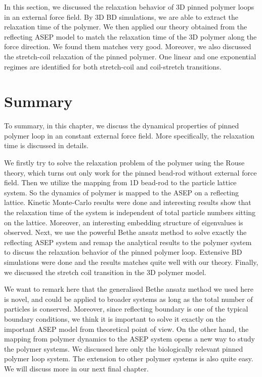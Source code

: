 In this section, we discussed the relaxation behavior of 3D pinned polymer loops in an external force field. By 3D BD simulations, we are able to extract the relaxation time of the polymer. We then applied our theory obtained from the reflecting ASEP model to match the relaxation time of the 3D polymer along the force direction. We found them matches very good. Moreover, we also discussed the stretch-coil relaxation of the pinned polymer. One linear and one exponential regimes are identified for both stretch-coil and coil-stretch transitions.











\section{Summary}
\label{sec:summary}

To summary, in this chapter, we discuss the dynamical properties of pinned polymer loop in an constant external force field. More specifically, the relaxation time is discussed in details. 

We firstly try to solve the relaxation problem of the polymer using the Rouse theory, which turns out only work for the pinned bead-rod without external force field. Then we utilize the mapping from 1D bead-rod to the particle lattice system. So the dynamics of polymer is mapped to the ASEP on a reflecting lattice. Kinetic Monte-Carlo results were done and interesting results show that the relaxation time of the system is independent of total particle numbers sitting on the lattice. Moreover, an interesting embedding structure of eigenvalues is observed. Next, we use the powerful Bethe ansatz method to solve exactly the reflecting ASEP system and remap the analytical results to the polymer system to discuss the relaxation behavior of the pinned polymer loop. Extensive BD simulations were done and the results matches quite well with our theory. Finally, we discussed the stretch coil transition in the 3D polymer model.

We want to remark here that the generalised Bethe ansatz method we used here is novel, and could be applied to broader systems as long as the total number of particles is conserved. Moreover, since reflecting boundary is one of the typical boundary conditions, we think it is important to solve it exactly on the important ASEP model from theoretical point of view. On the other hand, the mapping from polymer dynamics to the ASEP system opens a new way to study the polymer systems. We discussed here only the biologically relevant pinned polymer loop system. The extension to other polymer systems is also quite easy. We will discuss more in our next final chapter.  
